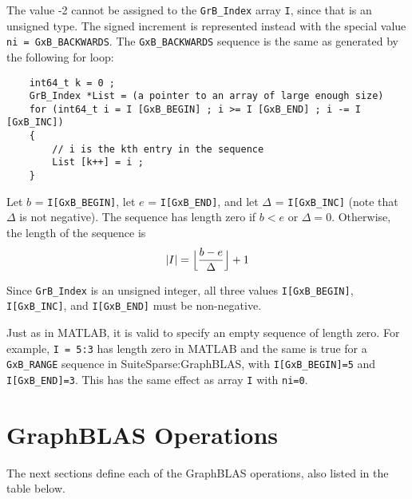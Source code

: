 \documentclass[12pt]{article}
\begin{document}
\begin{enumerate}
    \vspace{-0.1in}
    The value -2 cannot be assigned to the \verb'GrB_Index' array \verb'I',
    since that is an unsigned type.  The signed increment is represented
    instead with the special value \verb'ni = GxB_BACKWARDS'.
    The \verb'GxB_BACKWARDS' sequence is the same as generated by the following
    for loop:

    \vspace{-0.1in}
    {\footnotesize
    \begin{verbatim}
    int64_t k = 0 ;
    GrB_Index *List = (a pointer to an array of large enough size)
    for (int64_t i = I [GxB_BEGIN] ; i >= I [GxB_END] ; i -= I [GxB_INC])
    {
        // i is the kth entry in the sequence
        List [k++] = i ;
    } \end{verbatim}}

    \vspace{-0.1in}
    Let $b$ = \verb'I[GxB_BEGIN]', let $e$ = \verb'I[GxB_END]', and let
    $\Delta$ = \verb'I[GxB_INC]' (note that $\Delta$ is not negative).  The
    sequence has length zero if $b < e$ or $\Delta=0$.  Otherwise, the length
    of the sequence is
    \[
    |I| = \Bigl\lfloor\dfrac{b-e}{\Delta}\Bigr\rfloor + 1
    \]

\end{enumerate}

Since \verb'GrB_Index' is an unsigned integer, all three values
\verb'I[GxB_BEGIN]', \verb'I[GxB_INC]', and \verb'I[GxB_END]' must
be non-negative.

Just as in MATLAB, it is valid to specify an empty sequence of length zero.
For example, \verb'I = 5:3' has length zero in MATLAB and the same is
true for a \verb'GxB_RANGE' sequence in SuiteSparse:GraphBLAS, with
\verb'I[GxB_BEGIN]=5' and \verb'I[GxB_END]=3'.  This has the same
effect as array \verb'I' with \verb'ni=0'.

\newpage
\section{GraphBLAS Operations} %
\label{operations}

The next sections define each of the GraphBLAS operations, also listed in the
table below.
\end{document}
